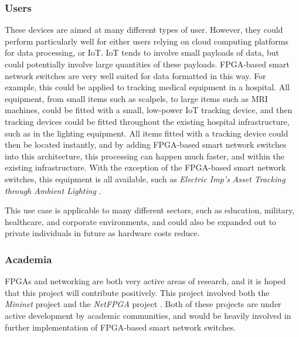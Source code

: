 \subsubsection{Users}
These devices are aimed at many different types of user. However, they could perform particularly well for either users relying on cloud computing platforms for data processing, or IoT. IoT tends to involve small payloads of data, but could potentially involve large quantities of these payloads. FPGA-based smart network switches are very well suited for data formatted in this way.
For example, this could be applied to tracking medical equipment in a hospital. All equipment, from small items such as scalpels, to large items such as MRI machines, could be fitted with a small, low-power IoT tracking device, and then tracking devices could be fitted throughout the existing hospital infrastructure, such as in the lighting equipment.
All items fitted with a tracking device could then be located instantly, and by adding FPGA-based smart network switches into this architecture, this processing can happen much faster, and within the existing infrastructure.
With the exception of the FPGA-based smart network switches, this equipment is all available, such as \textit{Electric Imp's} \textit{Asset Tracking through Ambient Lighting} \cite{electric_imp} \cite{electric_imp_asset_tracking}.

This use case is applicable to many different sectors, such as education, military, healthcare, and corporate environments, and could also be expanded out to private individuals in future as hardware costs reduce.

\subsubsection{Academia}
FPGAs and networking are both very active areas of research, and it is hoped that this project will contribute positively. This project involved both the \textit{Mininet} project \cite{mininet} and the \textit{NetFPGA} project \cite{NetFPGA}. Both of these projects are under active development by academic communities, and would be heavily involved in further implementation of FPGA-based smart network switches.

